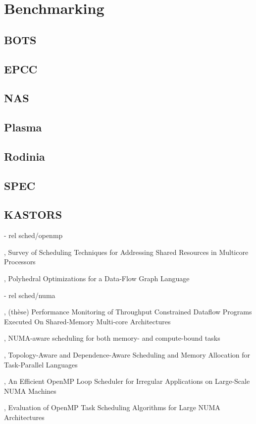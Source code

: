 \section{Benchmarking}

\subsection{BOTS}
\subsection{EPCC}
\subsection{NAS}
\subsection{Plasma}
\subsection{Rodinia}
\subsection{SPEC}
\subsection{KASTORS}

  - rel sched/openmp

\cite{Zhuravlev2012}, Survey of Scheduling Techniques for Addressing Shared Resources in Multicore Processors

\cite{Sbirlea2015}, Polyhedral Optimizations for a Data-Flow Graph Language

  - rel sched/numa

\cite{Selva2015}, (thèse) Performance Monitoring of Throughput Constrained Dataflow Programs Executed On Shared-Memory Multi-core Architectures

\cite{Reinman2015}, NUMA-aware scheduling for both memory- and compute-bound tasks

\cite{Drebes2014}, Topology-Aware and Dependence-Aware Scheduling and Memory Allocation for Task-Parallel Languages

\cite{Durand2013}, An Efficient OpenMP Loop Scheduler for Irregular Applications on Large-Scale NUMA Machines

\cite{Clet2014}, Evaluation of OpenMP Task Scheduling Algorithms for Large NUMA Architectures

